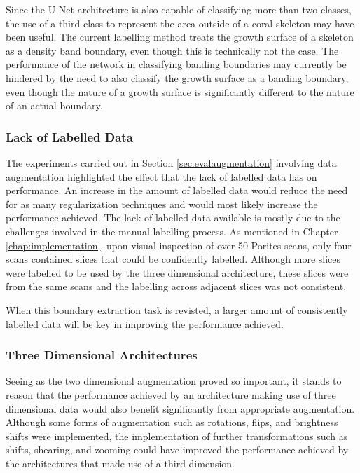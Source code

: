 Since the U-Net architecture is also capable of classifying more than two classes, the use of a third class to represent the area outside of a coral skeleton may have been useful. The current labelling method treats the growth surface of a skeleton as a density band boundary, even though this is technically not the case. The performance of the network in classifying banding boundaries may currently be hindered by the need to also classify the growth surface as a banding boundary, even though the nature of a growth surface is significantly different to the nature of an actual boundary.

\subsubsection{Lack of Labelled Data}

The experiments carried out in Section \ref{sec:evalaugmentation} involving data augmentation highlighted the effect that the lack of labelled data has on performance. An increase in the amount of labelled data would reduce the need for as many regularization techniques and would most likely increase the performance achieved. The lack of labelled data available is mostly due to the challenges involved in the manual labelling process. As mentioned in Chapter \ref{chap:implementation}, upon visual inspection of over 50 Porites scans, only four scans contained slices that could be confidently labelled. Although more slices were labelled to be used by the three dimensional architecture, these slices were from the same scans and the labelling across adjacent slices was not consistent.

When this boundary extraction task is revisted, a larger amount of consistently labelled data will be key in improving the performance achieved.

\subsubsection{Three Dimensional Architectures}

Seeing as the two dimensional augmentation proved so important, it stands to reason that the performance achieved by an architecture making use of three dimensional data would also benefit significantly from appropriate augmentation. Although some forms of augmentation such as rotations, flips, and brightness shifts were implemented, the implementation of further transformations such as shifts, shearing, and zooming could have improved the performance achieved by the architectures that made use of a third dimension.

